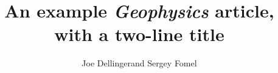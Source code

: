 \documentclass[paper,revised]{geophysics}
\begin{document}
\title{An example \emph{Geophysics} article, \\ with a two-line title}

\renewcommand{\thefootnote}{\fnsymbol{footnote}} 


\address{
\footnotemark[1]BP UTG, \\
200 Westlake Park Blvd, \\
Houston, TX, 77079 \\
\footnotemark[2]Bureau of Economic Geology, \\
John A. and Katherine G. Jackson School of Geosciences \\
The University of Texas at Austin \\
University Station, Box X \\
Austin, TX 78713-8924}
\author{Joe Dellinger\footnotemark[1] and Sergey Fomel\footnotemark[2]}


\maketitle
\end{document}
